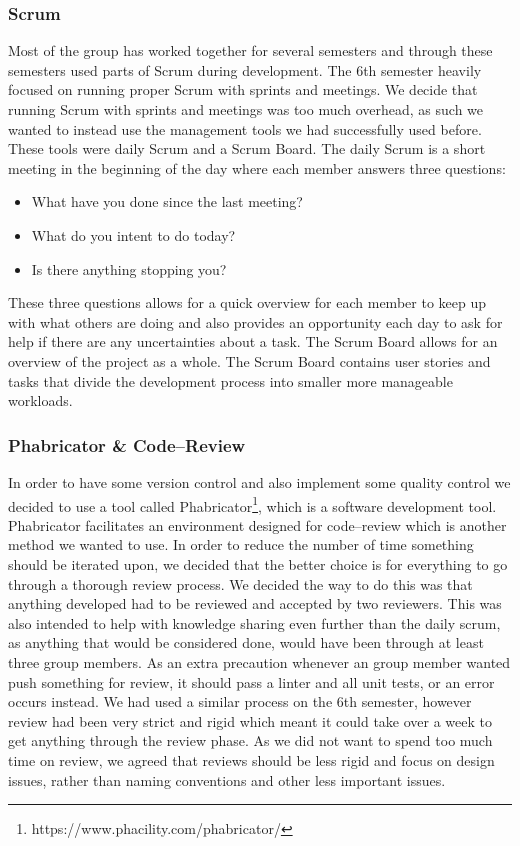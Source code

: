 \subsubsection{Scrum}
Most of the group has worked together for several semesters and through these semesters used parts of Scrum during development.
The 6th semester heavily focused on running proper Scrum with sprints and meetings.
We decide that running Scrum with sprints and meetings was too much overhead, as such we wanted to instead use the management tools we had successfully used before.
These tools were daily Scrum and a Scrum Board.
The daily Scrum is a short meeting in the beginning of the day where each member answers three questions:
\begin{itemize}
    \item What have you done since the last meeting?
    \item What do you intent to do today?
    \item Is there anything stopping you?
\end{itemize}
These three questions allows for a quick overview for each member to keep up with what others are doing and also provides an opportunity each day to ask for help if there are any uncertainties about a task.
The Scrum Board allows for an overview of the project as a whole.
The Scrum Board contains user stories and tasks that divide the development process into smaller more manageable workloads.
\subsubsection{Phabricator \& Code--Review}
In order to have some version control and also implement some quality control we decided to use a tool called Phabricator\footnote{https://www.phacility.com/phabricator/}, which is a software development tool.
Phabricator facilitates an environment designed for code--review which is another method we wanted to use.
In order to reduce the number of time something should be iterated upon, we decided that the better choice is for everything to go through a thorough review process.
We decided the way to do this was that anything developed had to be reviewed and accepted by two reviewers.
This was also intended to help with knowledge sharing even further than the daily scrum, as anything that would be considered done, would have been through at least three group members.
As an extra precaution whenever an group member wanted push something for review, it should pass a linter and all unit tests, or an error occurs instead.
We had used a similar process on the 6th semester, however review had been very strict and rigid which meant it could take over a week to get anything through the review phase.
As we did not want to spend too much time on review, we agreed that reviews should be less rigid and focus on design issues, rather than naming conventions and other less important issues.
